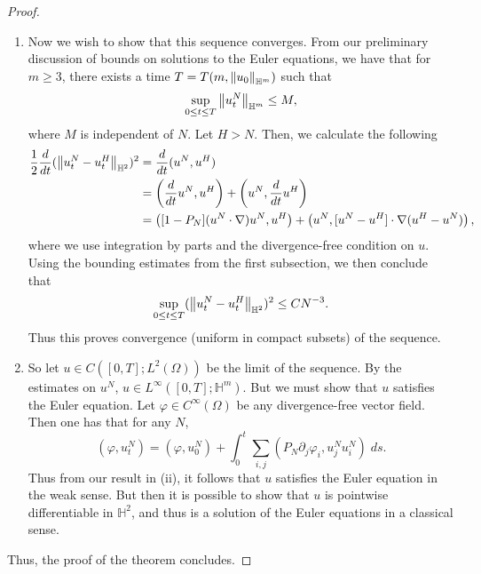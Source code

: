\documentclass{article}
\begin{document}
\begin{proof}
\begin{enumerate}[itemsep =-2pt,label = (\roman{*})]
		\begin{equation*}
			\frac{d}{dt}(\norm{u_{t}^{N}}_{L^{2}}^{2}) = 0 \implies \sum_{k}|\hat{u}^{N}_{t}(k)|^{2} = \sum_{k}|\hat{u}^{N}_{0}(k)|^{2}. 
		\end{equation*} 
		Therefore, this implies that solutions to the above ODE (and thus PDE) can be extended to arbitrary $T > 0$; conservation of energy also immediately implies uniqueness. Thus we have constructed a sequence of approximated solutions. 
		\item Now we wish to show that this sequence converges. From our preliminary discussion of bounds on solutions to the Euler equations, we have that for $m \geq 3$, there exists a time $T = T(m, \left\Vert u_{0} \right\Vert_{\mathbb{H}^{m}})$ such that 
		\begin{equation*}
			\sup_{0 \leq t \leq T}\left\Vert u_{t}^{N} \right\Vert_{\mathbb{H}^{m}} \leq M, 
		\end{equation*} 
		where $M$ is independent of $N$. Let $H > N$. Then, we calculate the following 
		\begin{align*}
			\begin{split}
				\frac{1}{2}\frac{d}{dt}(\left\Vert u_{t}^{N} - u_{t}^{H} \right\Vert_{\mathbb{H}^{2}})^{2} &= \frac{d}{dt}(u^{N}, u^{H}) \\
				&= \left(\frac{d}{dt}u^{N}, u^{H}\right) + \left(u^{N}, \frac{d}{dt}u^{H}\right) \\
				&= \left([1 - P_{N}](u^{N} \cdot \nabla)u^{N}, u^{H}\right) + \left(u^{N}, [u^{N} - u^{H}] \cdot \nabla(u^{H} - u^{N})\right), 
			\end{split} 
		\end{align*} 
		where we use integration by parts and the divergence-free condition on $u$. Using the bounding estimates from the first subsection, we then conclude that 
		\begin{equation*}
			\sup_{0 \leq t \leq T}(\left\Vert u_{t}^{N} - u_{t}^{H} \right\Vert_{\mathbb{H}^{2}})^{2} \leq CN^{-3}. 
		\end{equation*} 
		Thus this proves convergence (uniform in compact subsets) of the sequence. 
		\item So let $u \in C([0,T]; L^{2}(\Omega))$ be the limit of the sequence. By the estimates on $u^{N}$, $u \in L^{\infty}([0,T]; \mathbb{H}^{m})$. But we must show that $u$ satisfies the Euler equation. Let $\varphi \in C^{\infty}(\Omega)$ be any divergence-free vector field. Then one has that for any $N$, 
		\begin{equation*}
			(\varphi, u_{t}^{N}) = (\varphi, u_{0}^{N}) + \int_{0}^{t}\sum_{i,j}(P_{N}\partial_{j}\varphi_{i}, u_{j}^{N}u_{i}^{N})\;ds. 
		\end{equation*} 
		Thus from our result in (ii), it follows that $u$ satisfies the Euler equation in the weak sense. But then it is possible to show that $u$ is pointwise differentiable in $\mathbb{H}^{2}$, and thus is a solution of the Euler equations in a classical sense.
	\end{enumerate}
	Thus, the proof of the theorem concludes. 
\end{proof} 
\end{document}
